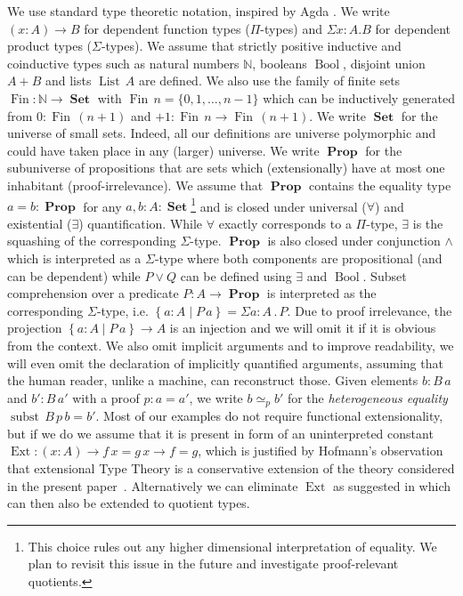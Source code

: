 \documentclass[envcountsame]{llncs}
\newcommand{\N}{\mathbb{N}}
\newcommand{\dotop}{\mathrel{.}}
\providecommand{\set}  [1]{\left\{#1\right\}}
\DeclareMathOperator{\Prop}{\mathbf{Prop}}
\DeclareMathOperator{\Set}{\mathbf{Set}}
\DeclareMathOperator{\Ext}{Ext}
\DeclareMathOperator{\Bool}{Bool}
\DeclareMathOperator{\subst}{subst}
\DeclareMathOperator{\List}{List}
\DeclareMathOperator{\Fin}{Fin}
\renewcommand{\equiv}{=}
\begin{document}
We use standard type theoretic notation, inspired by Agda
\cite{norell-phd}. We write $(x : A) \to B$ for dependent function
types ($\Pi$-types) and $\Sigma x:A.B$ for dependent product types
($\Sigma$-types). We assume that strictly positive inductive and
coinductive types such as natural numbers $\N$, booleans $\Bool$,
disjoint union $A + B$ and lists $\List\,A$ are defined. We also use
the family of finite sets $\Fin : \N \to \Set$ with $\Fin\,n = \{ 0 ,
1, \dots, n-1\}$ which can be inductively generated from $0 :
\Fin\,(n+1)$ and $+1 : \Fin\,n \to \Fin\,(n+1) $. We write $\Set$ for
the universe of small sets. Indeed, all our definitions are universe
polymorphic and could have taken place in any (larger) universe.  We
write $\Prop$ for the subuniverse of propositions that are sets which
(extensionally) have at most one inhabitant (proof-irrelevance). We assume that $\Prop$
contains the equality type $a = b : \Prop$ for any $a,b : A : \Set$\footnote{This choice rules out any higher dimensional interpretation
of equality. We plan to revisit this issue in the future and
investigate proof-relevant quotients.}  and is closed under
universal ($\forall$) and existential ($\exists$)
quantification. While $\forall$ exactly corresponds to a $\Pi$-type,
$\exists$ is the squashing \cite{mendler1990quotient} of the
corresponding $\Sigma$-type.  $\Prop$ is also closed under conjunction
$\wedge$ which is interpreted as a $\Sigma$-type where both components
are propositional (and can be dependent) while $P \vee Q$ can be
defined using $\exists$ and $\Bool$.  Subset comprehension over a
predicate $P : A \to \Prop$  is interpreted as the corresponding $\Sigma$-type,
i.e. $\set{a:A\mid P\,a}=\Sigma a:A \dotop P$. Due to proof
irrelevance, the projection $\set{a:A\mid P\,a} \to A$ is an injection
and we will omit it if it is obvious from the context. We also omit
implicit arguments and to improve readability, we will even omit the
declaration of implicitly quantified arguments, assuming that the
human reader, unlike a machine, can reconstruct those. Given elements $b : B\,a$ and $b' : B\,a'$ with a proof $p : a = a'$,
we write $b \simeq_{p} b'$ for  the \emph{heterogeneous equality} $\subst\,B\,p\,b \equiv b'$. Most of
our examples do not require functional extensionality, but if we do we
assume that it is present in form of an uninterpreted constant $\Ext : (x : A) \to f\,x = g\,x \to f = g$,
which is justified by Hofmann's observation that extensional Type
Theory is a conservative extension of the theory considered in the present paper~\cite{hofmann1995thesis}. Alternatively we can eliminate $\Ext$ as suggested in
\cite{alti:lics99} which can then also be extended to quotient types.
\end{document}

